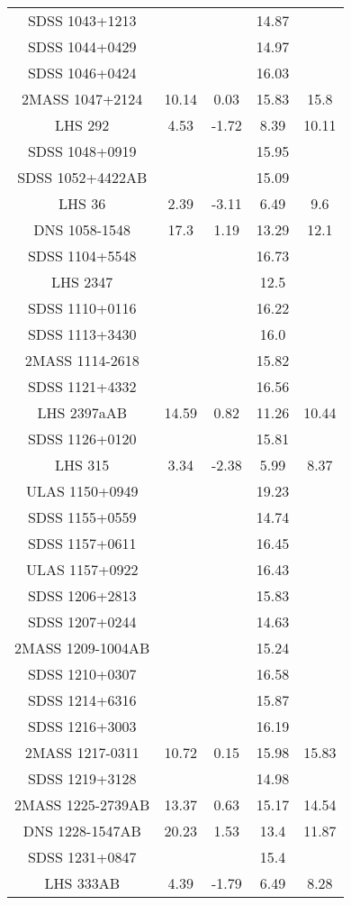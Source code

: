 \begin{table}
\begin{tabular}{ccccc}
SDSS 1043+1213 &  &  & 14.87 &  \\
SDSS 1044+0429 &  &  & 14.97 &  \\
SDSS 1046+0424 &  &  & 16.03 &  \\
2MASS 1047+2124 & 10.14 & 0.03 & 15.83 & 15.8 \\
LHS 292 & 4.53 & -1.72 & 8.39 & 10.11 \\
SDSS 1048+0919 &  &  & 15.95 &  \\
SDSS 1052+4422AB &  &  & 15.09 &  \\
LHS 36 & 2.39 & -3.11 & 6.49 & 9.6 \\
DNS 1058-1548 & 17.3 & 1.19 & 13.29 & 12.1 \\
SDSS 1104+5548 &  &  & 16.73 &  \\
LHS 2347 &  &  & 12.5 &  \\
SDSS 1110+0116 &  &  & 16.22 &  \\
SDSS 1113+3430 &  &  & 16.0 &  \\
2MASS 1114-2618 &  &  & 15.82 &  \\
SDSS 1121+4332 &  &  & 16.56 &  \\
LHS 2397aAB & 14.59 & 0.82 & 11.26 & 10.44 \\
SDSS 1126+0120 &  &  & 15.81 &  \\
LHS 315 & 3.34 & -2.38 & 5.99 & 8.37 \\
ULAS 1150+0949 &  &  & 19.23 &  \\
SDSS 1155+0559 &  &  & 14.74 &  \\
SDSS 1157+0611 &  &  & 16.45 &  \\
ULAS 1157+0922 &  &  & 16.43 &  \\
SDSS 1206+2813 &  &  & 15.83 &  \\
SDSS 1207+0244 &  &  & 14.63 &  \\
2MASS 1209-1004AB &  &  & 15.24 &  \\
SDSS 1210+0307 &  &  & 16.58 &  \\
SDSS 1214+6316 &  &  & 15.87 &  \\
SDSS 1216+3003 &  &  & 16.19 &  \\
2MASS 1217-0311 & 10.72 & 0.15 & 15.98 & 15.83 \\
SDSS 1219+3128 &  &  & 14.98 &  \\
2MASS 1225-2739AB & 13.37 & 0.63 & 15.17 & 14.54 \\
DNS 1228-1547AB & 20.23 & 1.53 & 13.4 & 11.87 \\
SDSS 1231+0847 &  &  & 15.4 &  \\
LHS 333AB & 4.39 & -1.79 & 6.49 & 8.28 \\

\end{tabular}
\end{table}
